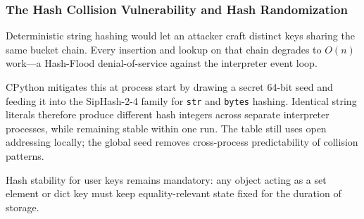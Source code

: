 \subsubsection{The Hash Collision Vulnerability and Hash Randomization}

Deterministic string hashing would let an attacker craft distinct keys sharing the same bucket chain. Every insertion and lookup on that chain degrades to $O(n)$ work---a Hash-Flood denial-of-service against the interpreter event loop.

CPython mitigates this at process start by drawing a secret 64-bit seed and feeding it into the SipHash-2-4 family for \texttt{str} and \texttt{bytes} hashing. Identical string literals therefore produce different hash integers across separate interpreter processes, while remaining stable within one run. The table still uses open addressing locally; the global seed removes cross-process predictability of collision patterns.

Hash stability for user keys remains mandatory: any object acting as a set element or dict key must keep equality-relevant state fixed for the duration of storage.
